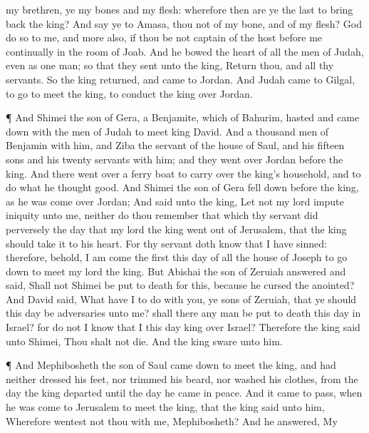 {{} my
brethren, ye
{} my
bones and my
flesh: wherefore then are ye the
last to bring
back the
king?
And
say ye to
Amasa,
{} thou not of my
bone, and of my
flesh?
God
do so to me, and
more also, if thou be not
captain of the
host
before me
continually in the
room of
Joab.
And he
bowed the
heart of all the
men of
Judah, even as
{}
one
man; so that they
sent
{} unto the
king,
Return thou, and all thy
servants.
So the
king
returned, and
came to
Jordan. And
Judah
came to
Gilgal, to
go to
meet the
king, to
conduct the
king
over
Jordan.
\par }{\PP {}¶ And
Shimei the
son of
Gera, a
Benjamite, which
{} of
Bahurim,
hasted and came
down with the
men of
Judah to
meet
king
David.
And
{} a
thousand
men of
Benjamin with him, and
Ziba the
servant of the
house of
Saul, and his
fifteen
sons and his
twenty
servants with him; and they went
over
Jordan
before the
king.
And there went
over a ferry
boat to carry
over the
king’s
household, and to
do what he
thought
good. And
Shimei the
son of
Gera fell
down
before the
king, as he was come
over
Jordan;
And
said unto the
king, Let not my
lord
impute
iniquity unto me, neither do thou
remember that which thy
servant did
perversely the
day that my
lord the
king went
out of
Jerusalem, that the
king should
take it to his
heart.
For thy
servant doth
know that I have
sinned: therefore, behold, I am
come the
first this
day of all the
house of
Joseph to go
down to
meet my
lord the
king.
But
Abishai the
son of
Zeruiah
answered and
said, Shall not
Shimei be put to
death for this, because he
cursed the
{}
anointed?
And
David
said, What have I to do with you, ye
sons of
Zeruiah, that ye should this
day be
adversaries unto me? shall there any
man be put to
death this
day in
Israel? for do not I
know that I
{} this
day
king over
Israel?
Therefore the
king
said unto
Shimei, Thou shalt not
die. And the
king
sware unto him.
\par }{\PP {}¶ And
Mephibosheth the
son of
Saul came
down to
meet the
king, and had
neither
dressed his
feet, nor
trimmed his
beard, nor
washed his
clothes, from the
day the
king
departed until the
day he
came
{} in
peace.
And it came to pass, when he was
come to
Jerusalem to
meet the
king, that the
king
said unto him, Wherefore
wentest not thou with me,
Mephibosheth?
And he
answered, My
}
